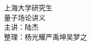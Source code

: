 \documentclass[a4paper]{article}
\begin{document}
    \begin{titlepage}
        \vspace*{144pt}
        \begin{center}
            \fontsize{36pt}{0} 上海大学研究生 \\
            \vspace*{36pt}
            \fontsize{36pt}{0} 量子场论讲义 \\
            \vspace*{64pt}
            \fontsize{20pt}{0} {主讲：陆杰} \\
            \vspace*{24pt}
            \fontsize{20pt}{0} {整理：杨光耀\quad 严禹坤\quad 吴梦之}
        \end{center}
    \end{titlepage}

    \tableofcontents
    \clearpage

    
    
    
    
\end{document}
